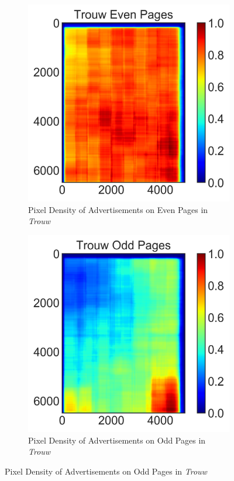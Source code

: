 \documentclass[USenglish]{article}
\begin{document}
\begin{figure}
  \centering
  \begin{subfigure}[b]{0.4\textwidth}
    \includegraphics[width=\textwidth]{figures/Trouw_Even_Pages_heatmap}
    \caption{Pixel Density of Advertisements on Even Pages in \textit{Trouw}}
    \label{fig:heatmapa}
  \end{subfigure}
  \begin{subfigure}[b]{0.4\textwidth}
    \includegraphics[width=\textwidth]{figures/Trouw_Odd_Pages_heatmap}
    \caption{Pixel Density of Advertisements on Odd Pages in \textit{Trouw}}
    \label{fig:heatmapb}
  \end{subfigure}
\end{figure}
\end{document}
